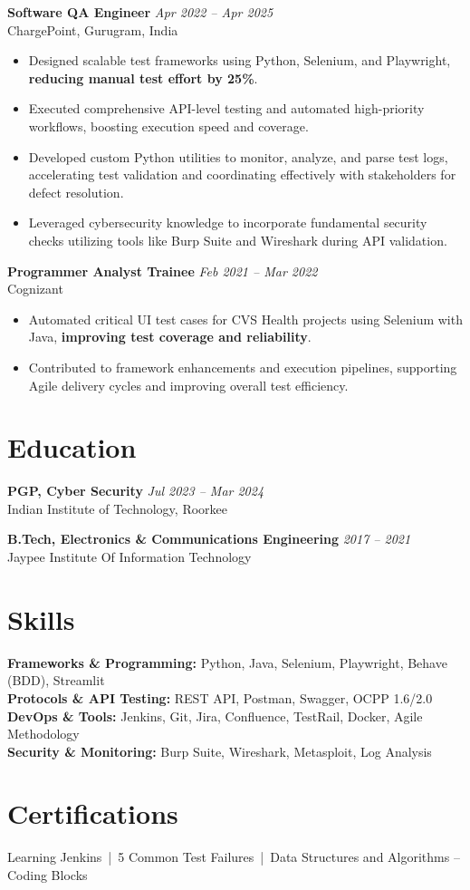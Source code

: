 \documentclass[a4paper,10pt]{article}
\begin{document}
\textbf{Software QA Engineer} \hfill \textit{Apr 2022 – Apr 2025}\\
ChargePoint, Gurugram, India
\begin{itemize}
    \item Designed scalable test frameworks using Python, Selenium, and Playwright, \textbf{reducing manual test effort by 25\%}.
    \item Executed comprehensive API-level testing and automated high-priority workflows, boosting execution speed and coverage.
    \item Developed custom Python utilities to monitor, analyze, and parse test logs, accelerating test validation and coordinating effectively with stakeholders for defect resolution.
    \item Leveraged cybersecurity knowledge to incorporate fundamental security checks utilizing tools like Burp Suite and Wireshark during API validation.
\end{itemize}

\textbf{Programmer Analyst Trainee} \hfill \textit{Feb 2021 – Mar 2022}\\
Cognizant
\begin{itemize}
    \item Automated critical UI test cases for CVS Health projects using Selenium with Java, \textbf{improving test coverage and reliability}.
    \item Contributed to framework enhancements and execution pipelines, supporting Agile delivery cycles and improving overall test efficiency.
\end{itemize}

\section{Education}

\textbf{PGP, Cyber Security} \hfill \textit{Jul 2023 – Mar 2024}\\
Indian Institute of Technology, Roorkee

\textbf{B.Tech, Electronics \& Communications Engineering} \hfill \textit{2017 – 2021}\\
Jaypee Institute Of Information Technology

\section{Skills}

\textbf{Frameworks \& Programming:} Python, Java, Selenium, Playwright, Behave (BDD), Streamlit\\
\textbf{Protocols \& API Testing:} REST API, Postman, Swagger, OCPP 1.6/2.0\\
\textbf{DevOps \& Tools:} Jenkins, Git, Jira, Confluence, TestRail, Docker, Agile Methodology\\
\textbf{Security \& Monitoring:} Burp Suite, Wireshark, Metasploit, Log Analysis

\section{Certifications}
Learning Jenkins \,|\, 5 Common Test Failures \,|\, Data Structures and Algorithms – Coding Blocks
\end{document}
